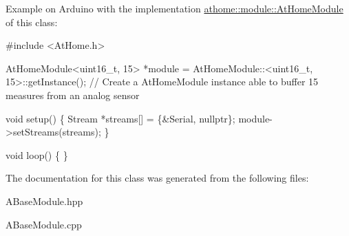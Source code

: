 Example on Arduino with the implementation \mbox{\hyperlink{classathome_1_1module_1_1_at_home_module}{athome\+::module\+::\+At\+Home\+Module}} of this class\+:


\begin{DoxyCode}
\textcolor{preprocessor}{#include <AtHome.h>}

AtHomeModule<uint16\_t, 15> *module = AtHomeModule::<uint16\_t, 15>::getInstance(); \textcolor{comment}{// Create a AtHomeModule
       instance able to buffer 15 measures from an analog sensor}

\textcolor{keywordtype}{void} setup() \{
  Stream *streams[] = \{&Serial, \textcolor{keyword}{nullptr}\};
  module->setStreams(streams);
\}

\textcolor{keywordtype}{void} loop() \{
\}
\end{DoxyCode}
 

The documentation for this class was generated from the following files\+:\begin{DoxyCompactItemize}
\item 
A\+Base\+Module.\+hpp\item 
A\+Base\+Module.\+cpp\end{DoxyCompactItemize}
